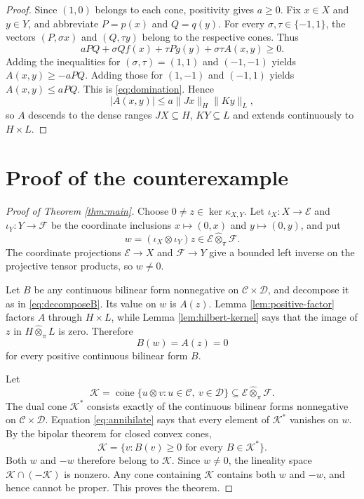 \documentclass[11pt]{article}
\newcommand{\Espace}{\mathcal E}
\newcommand{\Fspace}{\mathcal F}
\newcommand{\ConeE}{\mathcal C}
\newcommand{\ConeF}{\mathcal D}
\newcommand{\tp}{\widehat\otimes_\pi}
\begin{document}
\begin{proof}
Since $(1,0)$ belongs to each cone, positivity gives $a\ge0$.  Fix $x\in X$ and $y\in Y$, and abbreviate $P=p(x)$ and $Q=q(y)$.  For every $\sigma,\tau\in\{-1,1\}$, the vectors $(P,\sigma x)$ and $(Q,\tau y)$ belong to the respective cones.  Thus
\[
 aPQ+\sigma Qf(x)+\tau Pg(y)+\sigma\tau A(x,y)\ge0.
\]
Adding the inequalities for $(\sigma,\tau)=(1,1)$ and $(-1,-1)$ yields $A(x,y)\ge-aPQ$.  Adding those for $(1,-1)$ and $(-1,1)$ yields $A(x,y)\le aPQ$.  This is \eqref{eq:domination}.  Hence
\[
 |A(x,y)|\le a\|Jx\|_H\|Ky\|_L,
\]
so $A$ descends to the dense ranges $JX\subseteq H$, $KY\subseteq L$ and extends continuously to $H\times L$.
\end{proof}

\section{Proof of the counterexample}

\begin{proof}[Proof of Theorem \ref{thm:main}]
Choose $0\ne z\in\ker\kappa_{X,Y}$.  Let $\iota_X:X\to\Espace$ and $\iota_Y:Y\to\Fspace$ be the coordinate inclusions $x\mapsto(0,x)$ and $y\mapsto(0,y)$, and put
\[
 w=(\iota_X\otimes\iota_Y)z\in\Espace\tp\Fspace.
\]
The coordinate projections $\Espace\to X$ and $\Fspace\to Y$ give a bounded left inverse on the projective tensor products, so $w\ne0$.

Let $B$ be any continuous bilinear form nonnegative on $\ConeE\times\ConeF$, and decompose it as in \eqref{eq:decomposeB}.  Its value on $w$ is $A(z)$.  Lemma \ref{lem:positive-factor} factors $A$ through $H\times L$, while Lemma \ref{lem:hilbert-kernel} says that the image of $z$ in $H\tp L$ is zero.  Therefore
\begin{equation}\label{eq:annihilate}
 B(w)=A(z)=0
\end{equation}
for every positive continuous bilinear form $B$.

Let
\[
 \mathcal K=\overline{\operatorname{cone}}\{u\otimes v:u\in\ConeE,\ v\in\ConeF\}
 \subseteq\Espace\tp\Fspace.
\]
The dual cone $\mathcal K^*$ consists exactly of the continuous bilinear forms nonnegative on $\ConeE\times\ConeF$.  Equation \eqref{eq:annihilate} says that every element of $\mathcal K^*$ vanishes on $w$.  By the bipolar theorem for closed convex cones,
\[
 \mathcal K=\{v:B(v)\ge0\text{ for every }B\in\mathcal K^*\}.
\]
Both $w$ and $-w$ therefore belong to $\mathcal K$.  Since $w\ne0$, the lineality space $\mathcal K\cap(-\mathcal K)$ is nonzero.  Any cone containing $\mathcal K$ contains both $w$ and $-w$, and hence cannot be proper.  This proves the theorem.
\end{proof}
\end{document}
